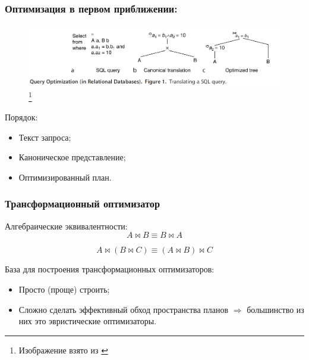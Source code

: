 \documentclass{beamer}
\begin{document}
\begin{frame}[allowframebreaks]
\frametitle{Оптимизация в первом приближении:}

\begin{figure}[htb]
\includegraphics[width=\textwidth,height=0.75\textheight,keepaspectratio]{optimization.png} 
\footnote{\tiny{Изображение взято из \cite{Neumann2009}}}
\end{figure}


Порядок:
\begin{itemize}
  \item Текст запроса;
  \item Каноническое представление;
  \item Оптимизированный план.
\end{itemize}

\end{frame}

\begin{frame}[allowframebreaks]
\frametitle{Трансформационный оптимизатор}

Алгебраические эквивалентности:
$$ A \bowtie B \equiv  B \bowtie A$$

$$ A \bowtie (B \bowtie C)\equiv (A \bowtie B) \bowtie C  $$

База для построения \alert{трансформационных} оптимизаторов:
\begin{itemize}
  \setlength\itemsep{1em}
  \item Просто (проще) строить;
  \item Сложно сделать эффективный обход пространства планов $\Rightarrow$ большинство из них это эвристические оптимизаторы.
\end{itemize}

\end{frame}
\end{document}
